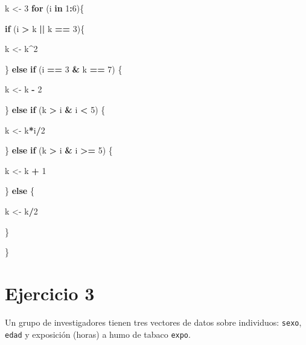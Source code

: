 \documentclass[
]{book}
\newenvironment{Shaded}{\begin{snugshade}}{\end{snugshade}}
\newcommand{\ControlFlowTok}[1]{\textcolor[rgb]{0.13,0.29,0.53}{\textbf{#1}}}
\newcommand{\DecValTok}[1]{\textcolor[rgb]{0.00,0.00,0.81}{#1}}
\newcommand{\NormalTok}[1]{#1}
\newcommand{\OperatorTok}[1]{\textcolor[rgb]{0.81,0.36,0.00}{\textbf{#1}}}
\newcommand{\StringTok}[1]{\textcolor[rgb]{0.31,0.60,0.02}{#1}}
\begin{document}
\begin{Shaded}
\begin{Highlighting}[]
\NormalTok{k <-}\StringTok{ }\DecValTok{3}
\ControlFlowTok{for}\NormalTok{ (i }\ControlFlowTok{in} \DecValTok{1}\OperatorTok{:}\DecValTok{6}\NormalTok{)\{}
  
  \ControlFlowTok{if}\NormalTok{ (i }\OperatorTok{>}\StringTok{ }\NormalTok{k }\OperatorTok{||}\StringTok{ }\NormalTok{k }\OperatorTok{==}\StringTok{ }\DecValTok{3}\NormalTok{)\{}
    
\NormalTok{    k <-}\StringTok{ }\NormalTok{k}\OperatorTok{^}\DecValTok{2}
    
\NormalTok{  \} }\ControlFlowTok{else} \ControlFlowTok{if}\NormalTok{ (i }\OperatorTok{==}\StringTok{ }\DecValTok{3} \OperatorTok{&}\StringTok{ }\NormalTok{k }\OperatorTok{==}\StringTok{ }\DecValTok{7}\NormalTok{) \{}
    
\NormalTok{    k <-}\StringTok{ }\NormalTok{k }\OperatorTok{-}\StringTok{ }\DecValTok{2}
    
\NormalTok{  \} }\ControlFlowTok{else} \ControlFlowTok{if}\NormalTok{ (k }\OperatorTok{>}\StringTok{ }\NormalTok{i }\OperatorTok{&}\StringTok{ }\NormalTok{i }\OperatorTok{<}\StringTok{ }\DecValTok{5}\NormalTok{) \{}
    
\NormalTok{    k <-}\StringTok{ }\NormalTok{k}\OperatorTok{*}\NormalTok{i}\OperatorTok{/}\DecValTok{2}
    
\NormalTok{  \} }\ControlFlowTok{else} \ControlFlowTok{if}\NormalTok{ (k }\OperatorTok{>}\StringTok{ }\NormalTok{i }\OperatorTok{&}\StringTok{ }\NormalTok{i }\OperatorTok{>=}\StringTok{ }\DecValTok{5}\NormalTok{) \{}
    
\NormalTok{    k <-}\StringTok{ }\NormalTok{k }\OperatorTok{+}\StringTok{ }\DecValTok{1}
    
\NormalTok{  \} }\ControlFlowTok{else}\NormalTok{ \{}
    
\NormalTok{    k <-}\StringTok{ }\NormalTok{k}\OperatorTok{/}\DecValTok{2}
    
\NormalTok{  \}}
  
\NormalTok{\}}
\end{Highlighting}
\end{Shaded}

\hypertarget{ejercicio-3}{%
\section{Ejercicio 3}\label{ejercicio-3}}

Un grupo de investigadores tienen tres vectores de datos sobre individuos: \texttt{sexo}, \texttt{edad} y exposición (horas) a humo de tabaco \texttt{expo}.
\end{document}
